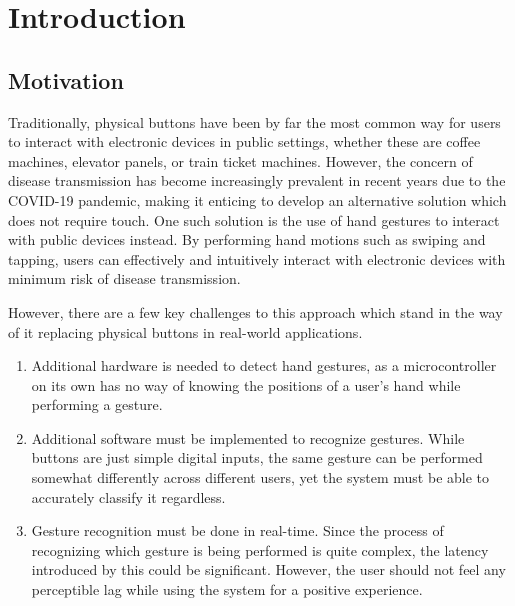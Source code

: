 \setlength{\parskip}{\baselineskip}%
\setlength{\parindent}{0pt}%

\section{Introduction}\label{sec:introduction}
\subsection{Motivation}\label{subsec:motivation}
Traditionally, physical buttons have been by far the most common way for users to interact with electronic devices in public settings, whether these are coffee machines, elevator panels, or train ticket machines.
However, the concern of disease transmission has become increasingly prevalent in recent years due to the COVID-19 pandemic, making it enticing to develop an alternative solution which does not require touch.
One such solution is the use of hand gestures to interact with public devices instead.
By performing hand motions such as swiping and tapping, users can effectively and intuitively interact with electronic devices with minimum risk of disease transmission.

However, there are a few key challenges to this approach which stand in the way of it replacing physical buttons in real-world applications.
\begin{enumerate}
    \item Additional hardware is needed to detect hand gestures, as a microcontroller on its own has no way of knowing the positions of a user's hand while performing a gesture.
    \item Additional software must be implemented to recognize gestures.
    While buttons are just simple digital inputs, the same gesture can be performed somewhat differently across different users, yet the system must be able to accurately classify it regardless.
    \item Gesture recognition must be done in real-time.
    Since the process of recognizing which gesture is being performed is quite complex, the latency introduced by this could be significant.
    However, the user should not feel any perceptible lag while using the system for a positive experience.
\end{enumerate}

